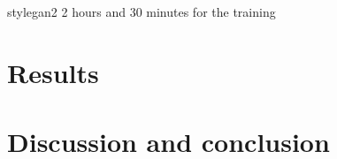 \documentclass{article}
\begin{document}
	stylegan2 2 hours and 30 minutes for the training 
	

	\section{Results}
	
%	
%	
	
	\section{Discussion and conclusion}
	
%	
%	
	\nocite{*} %
	
	
	\clearpage
	
\end{document}

